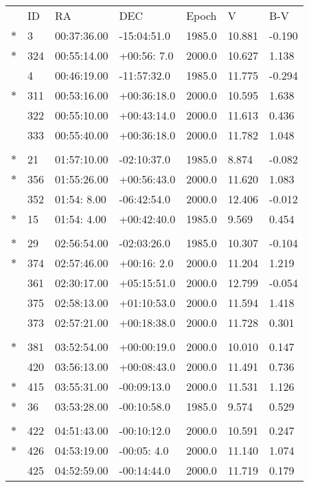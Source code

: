 \documentclass[10pt]{report}
\renewcommand{\[}{\begin{eqnarray}}
\renewcommand{\]}{\end{eqnarray}}
\begin{document}
\pagebreak
\begin{tabular}{lllllll}
 &  ID&    RA    &      DEC  &  Epoch&     V  &     B-V    \\
$\ast$&  3&00:37:36.00&-15:04:51.0&1985.0 & 10.881 & -0.190  \\
$\ast$&324&00:55:14.00&+00:56: 7.0&2000.0 & 10.627 &  1.138  \\
 &  4&00:46:19.00&-11:57:32.0&1985.0 & 11.775 & -0.294  \\
$\ast$&311&00:53:16.00&+00:36:18.0&2000.0 & 10.595 &  1.638  \\
 &322&00:55:10.00&+00:43:14.0&2000.0 & 11.613 &  0.436  \\
 &333&00:55:40.00&+00:36:18.0&2000.0 & 11.782 &  1.048  \\
\multicolumn{7}{l}{ }\\
$\ast$& 21&01:57:10.00&-02:10:37.0&1985.0 &  8.874 & -0.082  \\
$\ast$&356&01:55:26.00&+00:56:43.0&2000.0 & 11.620 &  1.083  \\
 &352&01:54: 8.00&-06:42:54.0&2000.0 & 12.406 & -0.012  \\
$\ast$& 15&01:54: 4.00&+00:42:40.0&1985.0 &  9.569 &  0.454  \\
\multicolumn{7}{l}{ }\\
$\ast$& 29&02:56:54.00&-02:03:26.0&1985.0 & 10.307 & -0.104 \\
$\ast$&374&02:57:46.00&+00:16: 2.0&2000.0 & 11.204 &  1.219 \\
 &361&02:30:17.00&+05:15:51.0&2000.0 & 12.799 & -0.054 \\
 &375&02:58:13.00&+01:10:53.0&2000.0 & 11.594 &  1.418 \\
 &373&02:57:21.00&+00:18:38.0&2000.0 & 11.728 &  0.301 \\
\multicolumn{7}{l}{ }\\
$\ast$&381&03:52:54.00&+00:00:19.0&2000.0 & 10.010 &  0.147\\
 &420&03:56:13.00&+00:08:43.0&2000.0 & 11.491 &  0.736\\
$\ast$&415&03:55:31.00&-00:09:13.0&2000.0 & 11.531 &  1.126\\
$\ast$& 36&03:53:28.00&-00:10:58.0&1985.0 &  9.574 &  0.529\\
\multicolumn{7}{l}{ }\\
$\ast$&422&04:51:43.00&-00:10:12.0&2000.0 & 10.591 &  0.247 \\
$\ast$&426&04:53:19.00&-00:05: 4.0&2000.0 & 11.140 &  1.074 \\
 &425&04:52:59.00&-00:14:44.0&2000.0 & 11.719 &  0.179 \\

\end{tabular}
\end{document}
